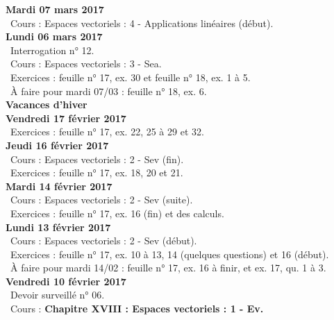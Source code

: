 \documentclass[12pt,a4paper]{article}
\begin{document}
\noindent\textbf{\bf Mardi 07 mars 2017} \\
\bu\ Cours : Espaces vectoriels : 4 - Applications linéaires (début).\vspace{.4cm}\\

\noindent\textbf{\bf Lundi 06 mars 2017} \\
\bu\ Interrogation n° 12.\\
\bu\ Cours : Espaces vectoriels : 3 - Sea.\\
\bu\ Exercices : feuille n° 17, ex. 30 et feuille n° 18, ex. 1 à 5.\\
\bu\ À faire pour mardi 07/03 : feuille n° 18, ex. 6.\vspace{.4cm}\\

\noindent\textbf{\bf Vacances d'hiver }\\

\noindent\textbf{Vendredi 17 février 2017}\\
\bu\ Exercices : feuille n° 17, ex. 22, 25 à 29 et 32.\vspace{.4cm}\\

\noindent\textbf{Jeudi 16 février 2017}\\
\bu\ Cours : Espaces vectoriels : 2 - Sev (fin).\\
\bu\ Exercices : feuille n° 17, ex. 18, 20 et 21.\vspace{.4cm}\\

\noindent\textbf{\bf Mardi 14 février 2017} \\
\bu\ Cours : Espaces vectoriels : 2 - Sev (suite).\\
\bu\ Exercices : feuille n° 17, ex. 16 (fin) et des calculs.\vspace{.4cm}\\

\noindent\textbf{\bf Lundi 13 février 2017} \\
\bu\ Cours : Espaces vectoriels : 2 - Sev (début).\\
\bu\ Exercices : feuille n° 17, ex. 10 à 13, 14 (quelques questions) et 16 (début).\\
\bu\ À faire pour mardi 14/02 : feuille n° 17, ex. 16 à finir, et ex. 17, qu. 1 à 3.\vspace{.4cm}\\

\noindent\textbf{Vendredi 10 février 2017}\\
\bu\ Devoir surveillé n° 06.\\
\bu\ Cours : \bf Chapitre XVIII \rm : Espaces vectoriels : 1 - Ev.\vspace{.4cm}\\ 
\end{document}
